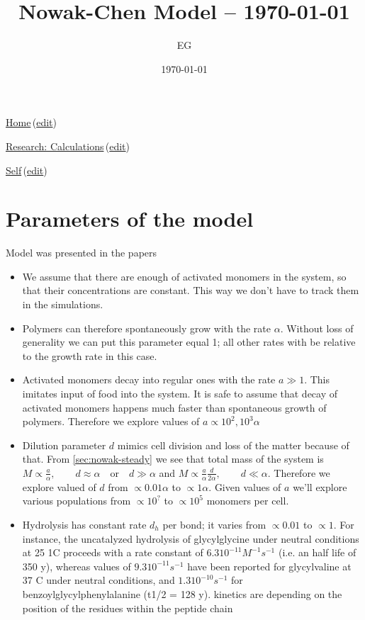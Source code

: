 \documentclass[12pt]{paper}
\title{Nowak-Chen Model -- \today}
\author{EG}
\date{\today}
\newcommand{\ga}{\alpha}
\newcommand{\wikilink}[2] { \href{#1.pdf}{#2}\,(\href{#1.tex}{edit})}
\begin{document}
 \maketitle
\wikilink{home}{Home}

\wikilink{research\_calculations}{Research: Calculations}

\wikilink{nowak-chen}{Self}

\tableofcontents


\section{Parameters of the model}
Model was presented in the papers \cite{nowak2008prevolutionary,Ohtsuki2009,Chen2012}
\begin{itemize}
 \item We assume that there are enough of activated monomers in the system, so that their 
concentrations are constant. This way we don't have to track them in the simulations.

\item Polymers can therefore spontaneously grow with the rate $\ga$. Without loss of generality we 
can put this parameter equal 1; all other rates with be relative to the growth rate in this case.

\item Activated monomers decay into regular ones with the rate $a\gg1$. This 
imitates input of food into the system. It is safe to assume that decay of activated monomers 
happens much faster than spontaneous growth of polymers. Therefore we explore values of $a\propto 
10^2,10^3\ga$
\item Dilution parameter $d$ mimics cell division and loss of the matter because of that. From 
\ref{sec:nowak-steady} we see that total mass of the system is  $ M\propto\frac{a}{\ga}, \qquad 
d\approx \ga\quad \mbox{or}\quad d\gg \ga$ and $M\propto \frac{a}{\ga}\frac{d}{2\ga} ,\qquad 
d\ll\ga$. Therefore we explore valued of $d$ from $\propto 0.01\ga$ to $\propto 1\ga$. Given 
values of $a$ we'll explore various populations from $\propto 10^?$ to $\propto 10^5$ monomers per 
cell.

\item Hydrolysis has constant rate $d_h$ per bond; it varies from $\propto 0.01$ to $\propto 1$. 
\subitem For instance, the
uncatalyzed hydrolysis of glycylglycine under neutral conditions
at 25 1C proceeds with a rate constant of $6.3  10^{-11} M^{-1} s^{-1}$
(i.e. an half life of 350 y), whereas values of $9.3 10^{-11} s^{-1}$
have been reported for glycylvaline at 37 C under neutral
conditions\cite{Smith1998}, and $1.3  10^{-10} s^{-1} $ for benzoylglycylphenylalanine
(t1/2 = 128 y)\cite{Bryant1996}.
\subitem kinetics are depending on the position of the residues within the peptide chain 
\cite{Danger2012}


\end{itemize}
\end{document}
